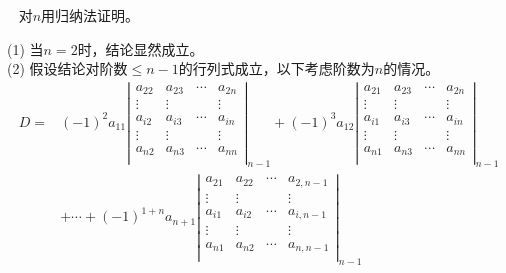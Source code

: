 \begin{frame}
~ 
  对$n$用归纳法证明。 \\[0.1in]\pause
  
  \noindent (1) 当$n=2$时，结论显然成立。\\[0.1in]\pause
  \noindent (2) 假设结论对阶数$\le n-1$的行列式成立，以下考虑阶数为$n$的情况。
    $$
    \begin{aligned}
      D = &  (-1)^{2} a_{11} \left|
        \begin{array}{cccc}
          a_{22}  & a_{23}   & \cdots & a_{2n}\\
          \vdots  & \vdots & & \vdots \\
          a_{i2}  & a_{i3}   & \cdots & a_{in}\\
          \vdots & \vdots  & & \vdots \\
          a_{n2}  & a_{n3}   & \cdots & a_{nn}\\
        \end{array}
      \right|_{n-1} + (-1)^{3} a_{12} \left|
        \begin{array}{cccc}
          a_{21}  & a_{23}  & \cdots & a_{2n}\\
          \vdots & \vdots & & \vdots \\
          a_{i1}  & a_{i3}  & \cdots & a_{in}\\
          \vdots & \vdots & & \vdots \\
          a_{n1}  & a_{n3}  & \cdots & a_{nn}\\
        \end{array}
      \right|_{n-1}\\
      & 
      + \cdots  
      + (-1)^{1+n} a_{n+1} \left|
        \begin{array}{cccc}
          a_{21}  & a_{22}   & \cdots & a_{2,n-1}\\
          \vdots  & \vdots & & \vdots \\
          a_{i1}  & a_{i2}   & \cdots & a_{i,n-1}\\
          \vdots & \vdots  & & \vdots \\
          a_{n1}  & a_{n2}   & \cdots & a_{n,n-1}\\
        \end{array}
      \right|_{n-1}
    \end{aligned}
    $$
\end{frame}

